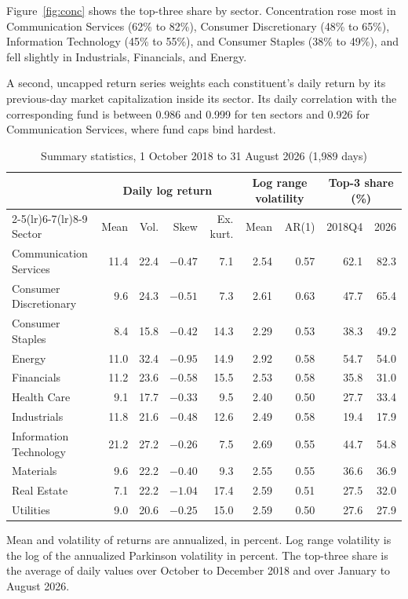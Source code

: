 \documentclass[11pt]{article}
\begin{document}
Figure~\ref{fig:conc} shows the top-three share by sector. Concentration rose most in Communication Services (62\% to 82\%), Consumer Discretionary (48\% to 65\%), Information Technology (45\% to 55\%), and Consumer Staples (38\% to 49\%), and fell slightly in Industrials, Financials, and Energy.

A second, uncapped return series weights each constituent's daily return by its previous-day market capitalization inside its sector. Its daily correlation with the corresponding fund is between 0.986 and 0.999 for ten sectors and 0.926 for Communication Services, where fund caps bind hardest.

\begin{table}[H]
\centering
\caption{Summary statistics, 1 October 2018 to 31 August 2026 (1,989 days)}
\label{tab:desc}
\small
\begin{tabular}{lrrrrrrrr}
\toprule
& \multicolumn{4}{c}{Daily log return} & \multicolumn{2}{c}{Log range volatility} & \multicolumn{2}{c}{Top-3 share (\%)} \\
\cmidrule(lr){2-5}\cmidrule(lr){6-7}\cmidrule(lr){8-9}
Sector & Mean & Vol. & Skew & Ex. kurt. & Mean & AR(1) & 2018Q4 & 2026 \\
\midrule
Communication Services & 11.4 & 22.4 & $-0.47$ & 7.1 & 2.54 & 0.57 & 62.1 & 82.3 \\
Consumer Discretionary & 9.6 & 24.3 & $-0.51$ & 7.3 & 2.61 & 0.63 & 47.7 & 65.4 \\
Consumer Staples & 8.4 & 15.8 & $-0.42$ & 14.3 & 2.29 & 0.53 & 38.3 & 49.2 \\
Energy & 11.0 & 32.4 & $-0.95$ & 14.9 & 2.92 & 0.58 & 54.7 & 54.0 \\
Financials & 11.2 & 23.6 & $-0.58$ & 15.5 & 2.53 & 0.58 & 35.8 & 31.0 \\
Health Care & 9.1 & 17.7 & $-0.33$ & 9.5 & 2.40 & 0.50 & 27.7 & 33.4 \\
Industrials & 11.8 & 21.6 & $-0.48$ & 12.6 & 2.49 & 0.58 & 19.4 & 17.9 \\
Information Technology & 21.2 & 27.2 & $-0.26$ & 7.5 & 2.69 & 0.55 & 44.7 & 54.8 \\
Materials & 9.6 & 22.2 & $-0.40$ & 9.3 & 2.55 & 0.55 & 36.6 & 36.9 \\
Real Estate & 7.1 & 22.2 & $-1.04$ & 17.4 & 2.59 & 0.51 & 27.5 & 32.0 \\
Utilities & 9.0 & 20.6 & $-0.25$ & 15.0 & 2.59 & 0.50 & 27.6 & 27.9 \\
\bottomrule
\end{tabular}

\smallskip
\parbox{0.95\textwidth}{\footnotesize Mean and volatility of returns are annualized, in percent. Log range volatility is the log of the annualized Parkinson volatility in percent. The top-three share is the average of daily values over October to December 2018 and over January to August 2026.}
\end{table}
\end{document}
